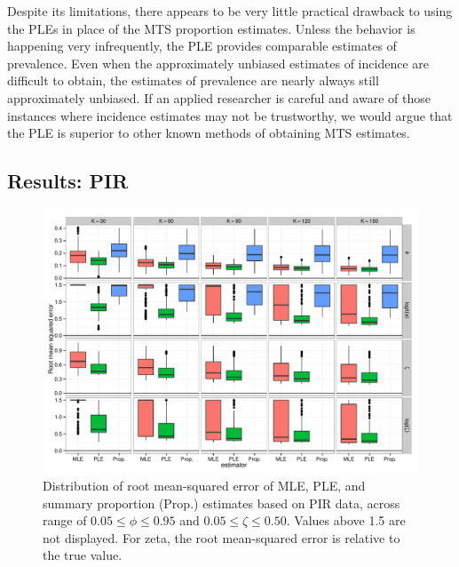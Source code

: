 \documentclass[man, noextraspace, floatsintext]{apa6}\usepackage[]{graphicx}\usepackage[]{color}
\makeatletter
\def\maxwidth{ %
  \ifdim\Gin@nat@width>\linewidth
    \linewidth
  \else
    \Gin@nat@width
  \fi
}
\newenvironment{knitrout}{}{} %
\makeatother
\begin{document}
Despite its limitations, there appears to be very little practical drawback to using the PLEs in place of the MTS proportion estimates. Unless the behavior is happening very infrequently, the PLE provides comparable estimates of prevalence. Even when the approximately unbiased estimates of incidence are difficult to obtain, the estimates of prevalence are nearly always still approximately unbiased. If an applied researcher is careful and aware of those instances where incidence estimates may not be trustworthy, we would argue that the PLE is superior to other known methods of obtaining MTS estimates.

\subsection{Results: PIR}

\begin{knitrout}
\color{fgcolor}\begin{figure}[tb]


{\centering \includegraphics[width=\maxwidth]{fig/PIR_RMSE} 

}

\caption[Distribution of root mean-squared error of MLE, PLE, and summary proportion (Prop]{Distribution of root mean-squared error of MLE, PLE, and summary proportion (Prop.) estimates based on PIR data, across range of $0.05 \leq \phi \leq 0.95$ and $0.05 \leq \zeta \leq 0.50$. Values above 1.5 are not displayed. For zeta, the root mean-squared error is relative to the true value.\label{fig:PIR_RMSE}}
\end{figure}


\end{knitrout}
\end{document}
